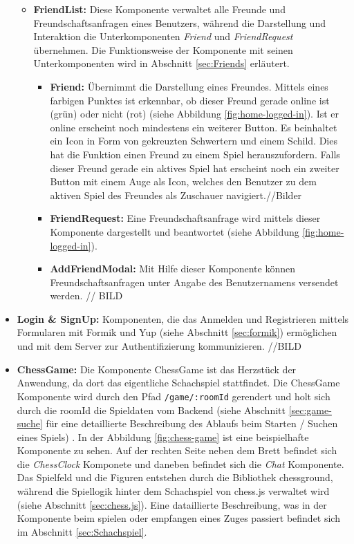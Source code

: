 \begin{itemize}
\begin{itemize}
\item \textbf{FriendList:} Diese Komponente verwaltet alle Freunde und Freundschaftsanfragen eines Benutzers, während die Darstellung und Interaktion die Unterkomponenten \textit{Friend} und \textit{FriendRequest} übernehmen. Die Funktionsweise der Komponente mit seinen Unterkomponenten wird in Abschnitt \ref{sec:Friends} erläutert.
\begin{itemize}
\item \textbf{Friend:} Übernimmt die Darstellung eines Freundes. Mittels eines farbigen Punktes ist erkennbar, ob dieser Freund gerade online ist (grün) oder nicht (rot) (siehe Abbildung \ref{fig:home-logged-in}). Ist er online erscheint noch mindestens ein weiterer Button. Es beinhaltet ein Icon in Form von gekreuzten Schwertern und einem Schild. Dies hat die Funktion einen Freund zu einem Spiel herauszufordern. Falls dieser Freund gerade ein aktives Spiel hat erscheint noch ein zweiter Button mit einem Auge als Icon, welches den Benutzer zu dem aktiven Spiel des Freundes als Zuschauer navigiert.//Bilder
\item \textbf{FriendRequest:} Eine Freundschaftsanfrage wird mittels dieser Komponente dargestellt und beantwortet (siehe Abbildung \ref{fig:home-logged-in}).
\item \textbf{AddFriendModal:} Mit Hilfe dieser Komponente können Freundschaftsanfragen unter Angabe des Benutzernamens versendet werden. // BILD
\end{itemize}
\end{itemize}

\item \textbf{Login \& SignUp:} Komponenten, die das Anmelden und Registrieren mittels Formularen mit Formik und Yup (siehe Abschnitt \ref{sec:formik}) ermöglichen und mit dem Server zur Authentifizierung kommunizieren. //BILD
\item \textbf{ChessGame:} Die Komponente ChessGame ist das Herzstück der Anwendung, da dort das eigentliche Schachspiel stattfindet. Die ChessGame Komponente wird durch den Pfad \verb|/game/:roomId| gerendert und holt sich durch die roomId die Spieldaten vom Backend (siehe Abschnitt \ref{sec:game-suche} für eine detaillierte Beschreibung des Ablaufs beim Starten / Suchen eines Spiels) . In der Abbildung \ref{fig:chess-game} ist eine beispielhafte Komponente zu sehen. Auf der rechten Seite neben dem Brett befindet sich die \textit{ChessClock} Komponete und daneben befindet sich die \textit{Chat} Komponente. Das Spielfeld und die Figuren entstehen durch die Bibliothek chessground, während die Spiellogik hinter dem Schachspiel von chess.js verwaltet wird (siehe Abschnitt \ref{sec:chess.js}). Eine dataillierte Beschreibung, was in der Komponente beim spielen oder empfangen eines Zuges passiert befindet sich im Abschnitt \ref{sec:Schachspiel}.




\end{itemize}

